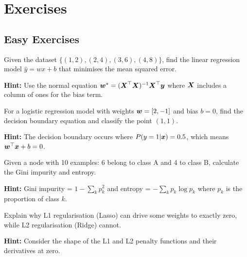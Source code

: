 








\section*{Exercises}

\subsection*{Easy Exercises}

\begin{problem}
\label{prob:linear-regression-basics}
Given the dataset $\{(1, 2), (2, 4), (3, 6), (4, 8)\}$, find the linear regression model $\hat{y} = wx + b$ that minimises the mean squared error.

\textbf{Hint:} Use the normal equation $\boldsymbol{w}^* = (\boldsymbol{X}^\top \boldsymbol{X})^{-1} \boldsymbol{X}^\top \boldsymbol{y}$ where $\boldsymbol{X}$ includes a column of ones for the bias term.
\end{problem}

\begin{problem}
\label{prob:logistic-decision-boundary}
For a logistic regression model with weights $\boldsymbol{w} = [2, -1]$ and bias $b = 0$, find the decision boundary equation and classify the point $(1, 1)$.

\textbf{Hint:} The decision boundary occurs where $P(y=1|\boldsymbol{x}) = 0.5$, which means $\boldsymbol{w}^\top \boldsymbol{x} + b = 0$.
\end{problem}

\begin{problem}
\label{prob:decision-tree-splitting}
Given a node with 10 examples: 6 belong to class A and 4 to class B, calculate the Gini impurity and entropy.

\textbf{Hint:} Gini impurity = $1 - \sum_{k} p_k^2$ and entropy = $-\sum_{k} p_k \log p_k$ where $p_k$ is the proportion of class $k$.
\end{problem}

\begin{problem}
\label{prob:regularization-effect}
Explain why L1 regularisation (Lasso) can drive some weights to exactly zero, while L2 regularisation (Ridge) cannot.

\textbf{Hint:} Consider the shape of the L1 and L2 penalty functions and their derivatives at zero.
\end{problem}

